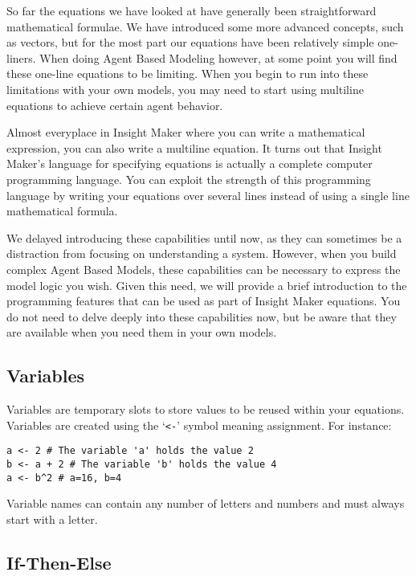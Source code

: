 \documentclass[]{memoir}
\begin{document}
So far the equations we have looked at have generally been
straightforward mathematical formulae. We have introduced some more
advanced concepts, such as vectors, but for the most part our equations
have been relatively simple one-liners. When doing Agent Based Modeling
however, at some point you will find these one-line equations to be
limiting. When you begin to run into these limitations with your own
models, you may need to start using multiline equations to achieve
certain agent behavior.

Almost everyplace in Insight Maker where you can write a mathematical
expression, you can also write a multiline equation. It turns out that
Insight Maker's language for specifying equations is actually a complete
computer programming language. You can exploit the strength of this
programming language by writing your equations over several lines
instead of using a single line mathematical formula.

We delayed introducing these capabilities until now, as they can
sometimes be a distraction from focusing on understanding a system.
However, when you build complex Agent Based Models, these capabilities
can be necessary to express the model logic you wish. Given this need,
we will provide a brief introduction to the programming features that
can be used as part of Insight Maker equations. You do not need to delve
deeply into these capabilities now, but be aware that they are available
when you need them in your own models.

\subsection{Variables}

Variables are temporary slots to store values to be reused within your
equations. Variables are created using the `\lstinline!<-!' symbol
meaning assignment. For instance:

\begin{lstlisting}
a <- 2 # The variable 'a' holds the value 2
b <- a + 2 # The variable 'b' holds the value 4
a <- b^2 # a=16, b=4
\end{lstlisting}

Variable names can contain any number of letters and numbers and must
always start with a letter.

\subsection{If-Then-Else}
\end{document}
